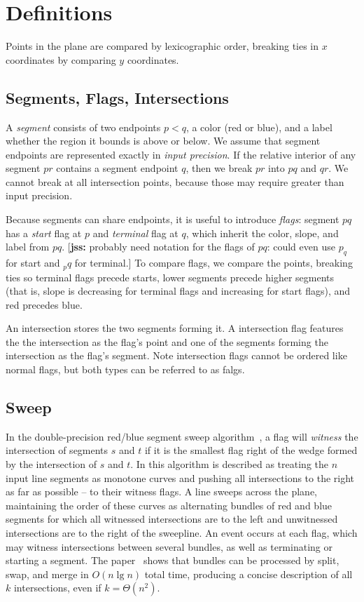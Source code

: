 \documentclass[11pt]{article}
\def\jss#1{{\footnotesize [{\bf jss:} #1]}}
\begin{document}
\section{Definitions}
Points in the plane are compared by lexicographic order, breaking ties in $x$ coordinates by comparing $y$ coordinates.

\subsection{Segments, Flags, Intersections}
A \textit{segment} consists of two endpoints $p<q$, a color (red or blue), and
a label whether the region it bounds is above or below. 
We assume that segment endpoints are represented exactly in {\it input precision}.
If the relative interior of any segment $pr$ contains a segment endpoint $q$, 
then we break $pr$ into $pq$ and $qr$. We cannot break at all intersection points, 
because those may require greater than input precision. 

Because segments can share endpoints, it is useful to introduce \textit{flags}: 
segment $pq$ has a \textit{start} flag at $p$ and \textit{terminal} flag at $q$, 
which inherit the color, slope, and label from $pq$. 
\jss{probably need notation for the flags of $pq$: could even use $p_q$ for start and $_pq$ for terminal.}
To compare flags, we compare the points, breaking ties so terminal flags precede starts, 
lower segments precede higher segments (that is, slope is decreasing for terminal flags and increasing for start flags), and red precedes blue.

An intersection stores the two segments forming it.
A intersection flag features the the intersection as the flag's point and one of the segments forming the intersection as the flag's segment.
Note intersection flags cannot be ordered like normal flags, but both types can be referred to as falgs.

\subsection{Sweep}\label{sec sweep}
In the double-precision red/blue segment sweep algorithm~\cite{MS}, a flag will \textit{witness} the intersection of segments $s$ and $t$ if it is the smallest flag right of the wedge formed by the intersection of $s$ and $t$.
In \cite{MS} this algorithm is described as 
treating the $n$ input line segments as monotone curves and pushing all intersections to the right as far as possible -- to their witness flags. 
A line sweeps across the plane, maintaining the order of these curves as alternating bundles of red and blue segments for which all witnessed intersections are to the left and unwitnessed intersections are to the right of the sweepline. 
An event occurs at each flag, which may witness intersections between several bundles, as well as terminating or starting a segment.  
The paper~\cite{MS} shows that bundles can be processed by split, swap, and merge in $O(n\lg n)$ total time, producing a concise description of all $k$ intersections, even if $k=\Theta(n^2)$.
\end{document}

